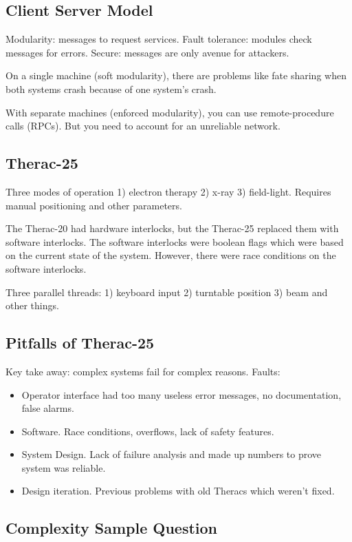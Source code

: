 \documentclass[psamsfonts]{amsart}
\begin{document}
\subsection{Client Server Model}

Modularity: messages to request services. Fault tolerance: modules check messages for errors. Secure: messages are only avenue for attackers.

On a single machine (soft modularity), there are problems like fate sharing when both systems crash because of one system's crash.

With separate machines (enforced modularity), you can use remote-procedure calls (RPCs). But you need to account for an unreliable network.

\subsection{Therac-25}

Three modes of operation 1) electron therapy 2) x-ray 3) field-light. Requires manual positioning and other parameters.

The Therac-20 had hardware interlocks, but the Therac-25 replaced them with software interlocks. The software interlocks were boolean flags which were based on the current state of the system. However, there were race conditions on the software interlocks.

Three parallel threads: 1) keyboard input 2) turntable position 3) beam and other things.

\subsection{Pitfalls of Therac-25}

Key take away: complex systems fail for complex reasons. Faults:
\begin{itemize}
  \item Operator interface had too many useless error messages, no documentation, false alarms.
  \item Software. Race conditions, overflows, lack of safety features.
  \item System Design. Lack of failure analysis and made up numbers to prove system was reliable.
  \item Design iteration. Previous problems with old Theracs which weren't fixed.
\end{itemize}

\subsection{Complexity Sample Question}
\end{document}
